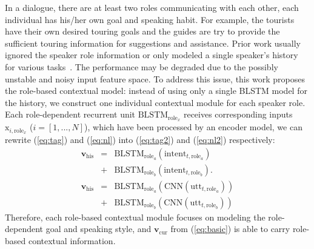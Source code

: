 \documentclass[11pt,letterpaper]{article}
\begin{document}
In a dialogue, there are at least two roles communicating with each other, each individual has his/her own goal and speaking habit.
For example, the tourists have their own desired touring goals and the guides are try to provide the sufficient touring information for suggestions and assistance.
Prior work usually ignored the speaker role information or only modeled a single speaker's history for various tasks~\cite{chen2016end,yang2017end}.
The performance may be degraded due to the possibly unstable and noisy input feature space.
To address this issue, this work proposes the role-based contextual model: instead of using only a single BLSTM model for the history, we construct one individual contextual module for each speaker role.
Each role-dependent recurrent unit $\text{BLSTM}_{\text{role}_x}$ receives corresponding inputs $\text{x}_{i,\text{role}_x}$ ($i=[1, ..., N]$), which have been processed by an encoder model, we can rewrite (\ref{eq:tag}) and (\ref{eq:nl}) into (\ref{eq:tag2}) and (\ref{eq:nl2}) respectively:
\begin{eqnarray}
\label{eq:tag2}
\textbf{v}_\text{his} &=& \text{BLSTM}_{\text{role}_a}(\text{intent}_{t,\text{role}_a}) \\
&+& \text{BLSTM}_{\text{role}_b}(\text{intent}_{t,\text{role}_b}).\nonumber\\
\label{eq:nl2}
\textbf{v}_\text{his} &=& \text{BLSTM}_{\text{role}_a}(\text{CNN}(\text{utt}_{t,\text{role}_a}))\\\nonumber
&+& \text{BLSTM}_{\text{role}_b}(\text{CNN}(\text{utt}_{t,\text{role}_b}))
\end{eqnarray}
Therefore, each role-based contextual module focuses on modeling the role-dependent goal and speaking style, and $\textbf{v}_\text{cur}$ from (\ref{eq:basic}) is able to carry role-based contextual information.


\iffalse
\end{document}
